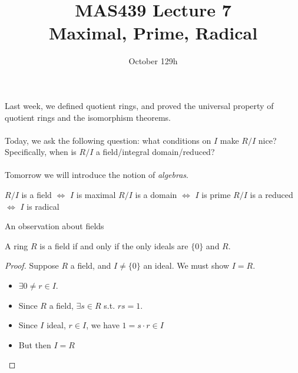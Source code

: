 \documentclass{beamer}
\title{MAS439 Lecture 7 \\ Maximal, Prime, Radical}
\date{October 129h}
\begin{document}
\begin{frame}
\titlepage
\end{frame}


\begin{frame}{}

Last week, we defined quotient rings, and proved the universal property of quotient rings and the isomorphism theorems. \\~\\

Today, we ask the following question: what conditions on $I$ make $R/I$ nice?  Specifically, when is $R/I$ a field/integral domain/reduced?  \\~\\

Tomorrow we will introduce the notion of \emph{algebras}.


\end{frame}

\begin{frame}[plain, c]

\huge
\begin{center}


{ $R/I$ is a field $\iff$ $I$ is maximal}
$R/I$ is a domain $\iff$ $I$ is prime
$R/I$ is a reduced $\iff$ $I$ is radical

\end{center}
\end{frame}


\begin{frame}{An observation about fields}

\begin{lemma} A ring $R$ is a field if and only if the only ideals are $\{0\}$ and $R$.
\end{lemma}

\begin{proof}
Suppose $R$ a field, and $I\neq\{0\}$ an ideal.  We must show $I=R$.

\begin{itemize}
\item $\exists 0 \neq r\in I$. 

\item  Since $R$ a field, $\exists s\in R$ s.t. $rs=1$.

\item Since $I$ ideal, $r\in I$, we have $1=s\cdot r\in I$

\item But then $I=R$

\end{itemize}
\end{proof}
\end{frame}
\end{document}
